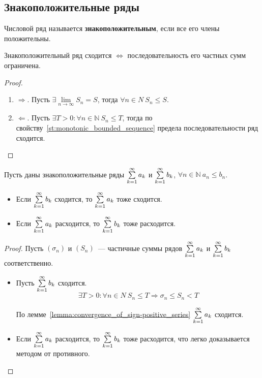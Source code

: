\subsection{Знакоположительные ряды}
 Числовой ряд называется \textbf{знакоположительным}, если все его члены положительны.

\begin{lemma}
\label{lemma:convergence_of_sign-positive_series}
Знакоположительный ряд сходится $\Leftrightarrow$ последовательность его частных сумм ограничена.
\end{lemma}
\begin{proof}
\begin{enumerate}
	\item $\Rightarrow$. Пусть $\exists \lim\limits_{n \to \infty} S_n = S$, тогда $\forall n \in N \ S_n \leqslant S$.
	\item $\Leftarrow$. Пусть $\exists T > 0 \colon \forall n \in \mathbb N \ S_n \leqslant T$, тогда по свойству~\ref{st:monotonic_bounded_sequence} предела последовательности ряд сходится.
\end{enumerate}
\end{proof}

\begin{theorem}[сравнения]
\label{th:direct_comparison_test1}
Пусть даны знакоположительные ряды $\series a_k$ и $\series b_k$, $\forall n \in \mathbb N \ a_n \leqslant b_n$.
\begin{itemize}
	\item Если $\series b_k$ сходится, то $\series a_k$ тоже сходится.
	\item Если $\series a_k$ расходится, то $\series b_k$ тоже расходится.
\end{itemize}
\end{theorem}
\begin{proof}
Пусть $(\sigma_n)$ и $(S_n)$~--- частичные суммы рядов $\series a_k$ и $\series b_k$ соответственно.
\begin{itemize}
	\item Пусть $\series b_k$ сходится.
	\begin{equation*}
	\exists T > 0 \colon \forall n \in N \ S_n \leqslant T \Rightarrow
	\sigma_n \leqslant S_n < T
	\end{equation*}
	
	По лемме~\ref*{lemma:convergence_of_sign-positive_series} $\series a_k$ сходится.
	
	\item Если $\series a_k$ расходится, то $\series b_k$ тоже расходится, что легко доказывается методом от противного.
\end{itemize}
\end{proof}

